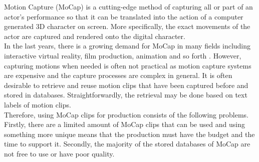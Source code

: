 Motion Capture (MoCap) is a cutting-edge method of capturing all or part of an actor's performance so that it can be translated into the action of a computer generated 3D character on screen. More specifically, the exact movements of the actor are captured and rendered onto the digital character. \\

In the last years, there is a growing demand for MoCap in many fields including interactive virtual reality, film production, animation and so forth \cite{Efficient Content-Based Retrieval of Motion Capture Data}. However, capturing motions when needed is often not practical as motion capture systems are expensive and the capture processes are complex in general. It is often desirable to retrieve and reuse motion clips that have been captured before and stored in databases. Straightforwardly, the retrieval may be done based on text labels of motion clips.\\ 

Therefore, using MoCap clips for production consists of the following problems. Firstly, there are a limited amount of MoCap clips that can be used and using something more unique means that the production must have the budget and the time to support it. Secondly, the majority of the stored databases of MoCap are not free to use or have poor quality.
